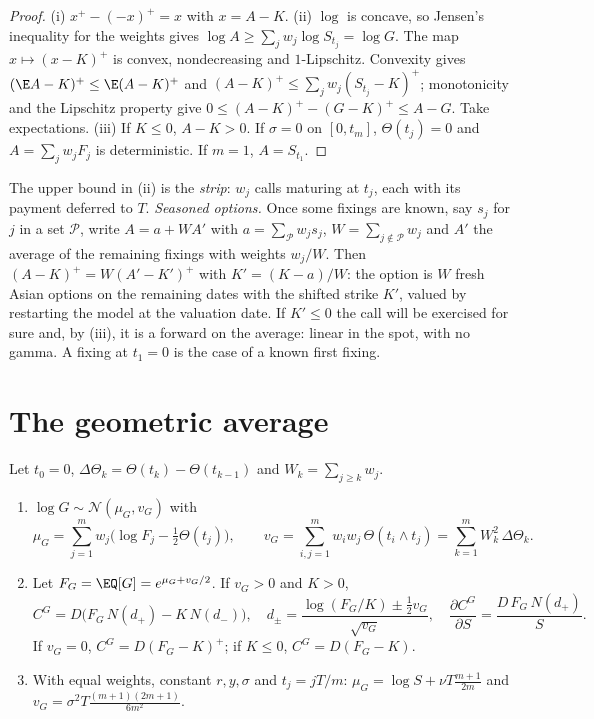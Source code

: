 \begin{proof}
(i) $x^+-(-x)^+=x$ with $x=A-K$. (ii) $\log$ is concave, so Jensen's inequality for the
weights gives $\log A\ge\sum_jw_j\log S_{t_j}=\log G$. The map $x\mapsto(x-K)^+$ is convex,
nondecreasing and $1$-Lipschitz. Convexity gives $(\E A-K)^+\le\E(A-K)^+$ and
$(A-K)^+\le\sum_jw_j(S_{t_j}-K)^+$; monotonicity and the Lipschitz property give
$0\le(A-K)^+-(G-K)^+\le A-G$. Take expectations. (iii) If $K\le0$, $A-K>0$. If $\sigma=0$ on
$[0,t_m]$, $\Theta(t_j)=0$ and $A=\sum_jw_jF_j$ is deterministic. If $m=1$, $A=S_{t_1}$.
\end{proof}

The upper bound in (ii) is the \emph{strip}: $w_j$ calls maturing at $t_j$, each with its
payment deferred to $T$. \emph{Seasoned options.} Once some fixings are known, say
$s_j$ for $j$ in a set $\mathcal P$, write $A=a+WA'$ with $a=\sum_{\mathcal P}w_js_j$,
$W=\sum_{j\notin\mathcal P}w_j$ and $A'$ the average of the remaining fixings with weights
$w_j/W$. Then $(A-K)^+=W(A'-K')^+$ with $K'=(K-a)/W$: the option is $W$ fresh Asian
options on the remaining dates with the shifted strike $K'$, valued by restarting the model
at the valuation date. If $K'\le0$ the call will be exercised for sure and, by (iii), it is
a forward on the average: linear in the spot, with no gamma. A fixing at $t_1=0$ is the
case of a known first fixing.

\section{The geometric average}\label{sec:as-geometric}

\begin{proposition}\label{prop:as-geometric}
Let $t_0=0$, $\Delta\Theta_k=\Theta(t_k)-\Theta(t_{k-1})$ and $W_k=\sum_{j\ge k}w_j$.
\begin{enumerate}[label=(\roman*)]
  \item $\log G\sim\mathcal N(\mu_G,v_G)$ with
    \[
      \mu_G=\sum_{j=1}^mw_j\big(\log F_j-\tfrac12\Theta(t_j)\big),\qquad
      v_G=\sum_{i,j=1}^mw_iw_j\,\Theta(t_i\wedge t_j)=\sum_{k=1}^mW_k^2\,\Delta\Theta_k .
    \]
  \item Let $F_G=\EQ[G]=e^{\mu_G+v_G/2}$. If $v_G>0$ and $K>0$,
    \[
      C^G=D\big(F_G\,N(d_+)-K\,N(d_-)\big),\quad d_\pm=\frac{\log(F_G/K)\pm\frac12v_G}{\sqrt{v_G}},
      \quad\frac{\partial C^G}{\partial S}=\frac{D\,F_G\,N(d_+)}{S}.
    \]
    If $v_G=0$, $C^G=D(F_G-K)^+$; if $K\le0$, $C^G=D(F_G-K)$.
  \item With equal weights, constant $r,y,\sigma$ and $t_j=jT/m$:
    $\mu_G=\log S+\nu T\frac{m+1}{2m}$ and $v_G=\sigma^2T\frac{(m+1)(2m+1)}{6m^2}$.
\end{enumerate}
\end{proposition}

